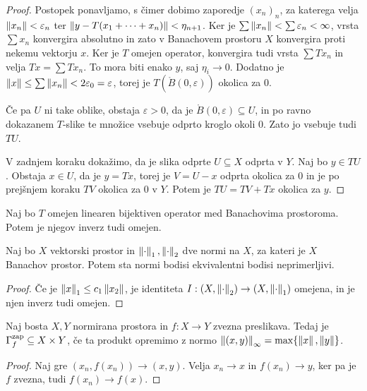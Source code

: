 \begin{proof}
  Postopek ponavljamo, s čimer dobimo zaporedje $(x_n)_n$, za katerega velja
  $\left\lVert x_n\right\rVert < \varepsilon_n$ ter $\left\lVert y - T(x_1 + \cdots + x_n)\right\rVert < \eta_{n+1}$.
  Ker je $\sum \left\lVert x_n\right\rVert < \sum \varepsilon_n < \infty$, vrsta $\sum x_n$
  konvergira absolutno in zato v Banachovem prostoru $X$ konvergira proti nekemu
  vektorju $x$.
  Ker je $T$ omejen operator, konvergira tudi vrsta $\sum T x_n$ in velja $Tx =
  \sum T x_n$.
  To mora biti enako $y$, saj $\eta_i \to 0$.
  Dodatno je $\left\lVert x\right\rVert \le \sum \left\lVert x_n\right\rVert < 2 \varepsilon_0 = \varepsilon$,
  torej je $T(\mathring{B}(0, \varepsilon))$ okolica za $0$.

  Če pa $U$ ni take oblike, obstaja $\varepsilon > 0$, da je $\mathring{B}(0,
  \varepsilon) \subseteq U$, in po ravno dokazanem $T$-slike te množice vsebuje
  odprto kroglo okoli $0$.
  Zato jo vsebuje tudi $TU$.

  V zadnjem koraku dokažimo, da je slika odprte $U \subseteq X$ odprta v $Y$.
  Naj bo $y \in TU$.
  Obstaja $x \in U$, da je $y = Tx$, torej je $V = U - x$ odprta okolica za $0$
  in je po prejšnjem koraku $TV$ okolica za $0$ v $Y$.
  Potem je $TU = TV + Tx$ okolica za $y$.
\end{proof}

\begin{posledica}
  Naj bo $T$ omejen linearen bijektiven operator med Banachovima prostoroma.
  Potem je njegov inverz tudi omejen.
\end{posledica}

\begin{posledica}
  Naj bo $X$ vektorski prostor in $\left\lVert\cdot\right\rVert_1, \left\lVert\cdot\right\rVert_2$ dve normi na
  $X$, za kateri je $X$ Banachov prostor.
  Potem sta normi bodisi ekvivalentni bodisi neprimerljivi.
\end{posledica}

\begin{proof}
  Če je $\left\lVert x\right\rVert_1 \le c_1 \left\lVert x_2\right\rVert$, je identiteta $I: (X, \left\lVert\cdot\right\rVert_2)
  \to (X, \left\lVert\cdot\right\rVert_1)$ omejena, in je njen inverz tudi omejen.
\end{proof}

\begin{lema}
  Naj bosta $X, Y$ normirana prostora in $f: X \to Y$ zvezna preslikava.
  Tedaj je $\Gamma_f ^\text{\normalfont zap}\subseteq X \times Y$, če ta produkt opremimo z normo
  $\left\lVert(x,y)\right\rVert_\infty = \max \{\left\lVert x\right\rVert, \left\lVert y\right\rVert\}$.
\end{lema}

\begin{proof}
  Naj gre $(x_n, f(x_n)) \to (x,y)$.
  Velja $x_n \to x$ in $f(x_n) \to y$, ker pa je $f$ zvezna, tudi $f(x_n) \to
  f(x)$.
\end{proof}

